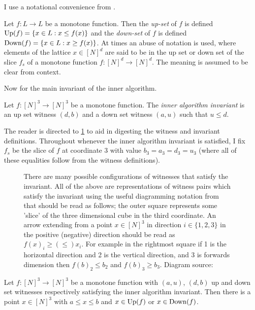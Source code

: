 I use a notational convenience from \citep{fasterTarski}.
\begin{definition}
  Let $f : L \to L$ be a monotone function. Then the \emph{up-set} of $f$ is defined $\mathrm{Up}(f) = \{x \in L : x \leq f(x)\}$
  and the \emph{down-set} of $f$ is defined $\mathrm{Down}(f) = \{x \in L : x \geq f(x)\}$. At times an abuse of notation is used,
  where elements of the lattice $x \in [N]^d$ are said to be in the up set or down
  set of the slice $f_s$ of a monotone function $f : [N]^d \to [N]^d$. The meaning
  is assumed to be clear from context.
\end{definition}
Now for the main invariant of the inner algorithm.
\begin{definition}
  Let $f : [N]^3 \to [N]^3$ be a monotone function. The \emph{inner algorithm invariant}
  is an up set witness $(d, b)$ and a down set witness $(a, u)$ such that $u \leq d$.
\end{definition}
The reader is directed to \cref{witnessFig} to aid in digesting the witness and invariant
definitions. Throughout whenever the inner algorithm invariant is satisfied,  
I fix $f_s$ be the slice of $f$ at coordinate $3$ with value $b_3 = a_3 = d_3 = u_3$ (where all of
these equalities follow from the witness definitions).
\begin{figure}[ht] 
  \centering
  \scalebox{0.4}{}
  \caption{There are many possible configurations of witnesses that satisfy the invariant.
  All of the above are representations of witness pairs which satisfy the invariant using the useful diagramming
  notation from \citep{fasterTarski} that should be read as follows; the outer square
  represents some 'slice' of the three dimensional cube in the third coordinate. An arrow
  extending from a point $x \in [N]^3$ in direction $i \in \{1, 2, 3\}$ in the positive (negative) direction
  should be read as $f(x)_i \geq (\leq) x_i$. For example in the rightmost square if 1 is the horizontal
  direction and 2 is the vertical direction, and 3 is forwards dimension then $f(b)_2 \leq b_2$ and $f(b)_3 \geq b_3$. 
  Diagram source: \citep{fasterTarski}} \label{witnessFig}
\end{figure}
\begin{lemma}
  Let $f : [N]^3 \to [N]^3$ be a monotone function with $(a, u)$, $(d, b)$ up
  and down set witnesses respectively satisfying the inner algorithm invariant.
  Then there is a point $x \in [N]^3$ with $a \leq x \leq b$ and $x \in \mathrm{Up}(f)$ or $x \in \mathrm{Down}(f)$.
\end{lemma}
